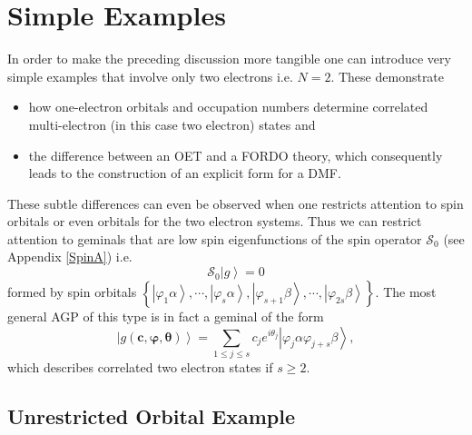 \documentclass[aps,preprint]{revtex4}%
\begin{document}
\section{Simple Examples\label{Examples}}

In order to make the preceding discussion more tangible one can introduce very
simple examples that involve only two electrons i.e. $N=2$. These demonstrate

\begin{itemize}
\item how one-electron orbitals and occupation numbers determine correlated
multi-electron (in this case two electron) states and

\item the difference between an OET and a FORDO theory, which consequently
leads to the construction of an explicit form for a DMF.
\end{itemize}

These subtle differences can even be observed when one restricts attention to
spin orbitals or even orbitals for the two electron systems. Thus we can
restrict attention to geminals that are low spin eigenfunctions of the spin
operator $\mathcal{S}_{0}$ (see Appendix \ref{SpinA}) i.e.
\begin{equation}
\mathcal{S}_{0}\left\vert g\right\rangle =0
\end{equation}
formed by spin orbitals $\left\{  \left\vert \varphi_{1}\alpha\right\rangle
,\cdots,\left\vert \varphi_{s}\alpha\right\rangle ,\left\vert \varphi
_{s+1}\beta\right\rangle ,\cdots,\left\vert \varphi_{2s}\beta\right\rangle
\right\}  $. The most general AGP of this type is in fact a geminal of the
form%
\begin{equation}
\left\vert g\left(  \boldsymbol{c},\boldsymbol{\varphi},\boldsymbol{\theta
}\right)  \right\rangle =\sum_{1\leq j\leq s}c_{j}e^{i\theta_{j}}\left\vert
\varphi_{j}\alpha\varphi_{j+s}\beta\right\rangle , \label{spinorbgem}%
\end{equation}
which describes correlated two electron states if $s\geq2$.

\subsection{Unrestricted Orbital Example}
\end{document}
